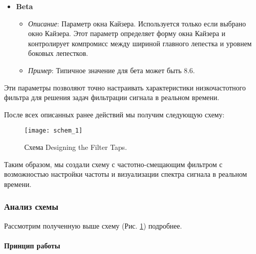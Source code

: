 \documentclass[a4paper,12pt]{extarticle}
\begin{document}
\begin{itemize}
    \item \textbf{Beta}
    \begin{itemize}
        \item \textit{Описание}: Параметр окна Кайзера. Используется только если выбрано окно Кайзера. Этот параметр определяет форму окна Кайзера и контролирует компромисс между шириной главного лепестка и уровнем боковых лепестков.
        \item \textit{Пример}: Типичное значение для бета может быть 8.6.
    \end{itemize}
\end{itemize}
\hspace{1.15cm}Эти параметры позволяют точно настраивать характеристики низкочастотного фильтра для решения задач фильтрации сигнала в реальном времени.

\vspace{0.25cm}После всех описанных ранее действий мы получим следующую схему:\\
\begin{figure}[H]
    \centering
    \texttt{[image: schem\_1]}
    \caption{Схема Designing the Filter Taps.} %
    \label{fig:schem_1} %
\end{figure}

Таким образом, мы создали схему с частотно-смещающим фильтром с возможностью настройки
частоты и визуализации спектра сигнала в реальном времени.

\subsubsection{Анализ схемы}

Рассмотрим полученную выше схему (Рис. \ref{fig:schem_1}) подробнее.

\paragraph{Принцип работы}
\end{document}
